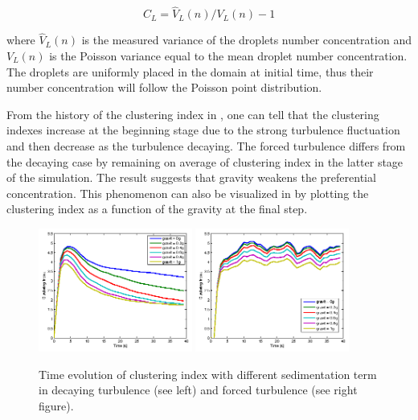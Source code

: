 \begin{equation}
C_L = \hat{V}_L(n)/V_L(n)-1
\label{eq:cluster_index}
\end{equation}

where $\hat{V}_L(n)$ is the measured variance of the droplets number
concentration and $V_L(n)$ is the Poisson variance equal to the mean droplet
number concentration. The droplets are uniformly placed in the domain at
initial time, thus their number concentration will follow the Poisson point
distribution.

From the history of the clustering index in , one can
tell that the clustering indexes increase at the beginning stage due to the
strong turbulence fluctuation and then decrease as the turbulence decaying. The
forced turbulence differs from the decaying case by remaining on average of
clustering index in the latter stage of the simulation. The result suggests
that gravity weakens the preferential concentration. This phenomenon can also
be visualized in  by plotting the clustering index as a
function of the gravity at the final step.

\begin{figure}[H]\centering
\includegraphics[width=0.45\textwidth]{Figures/gravity_time_decay}
\includegraphics[width=0.45\textwidth]{Figures/gravity_time_force}
\caption{Time evolution of clustering index with different sedimentation term in decaying turbulence (see left) and
forced turbulence (see right figure).}
\label{fig:gravity_cluster}
\end{figure}


